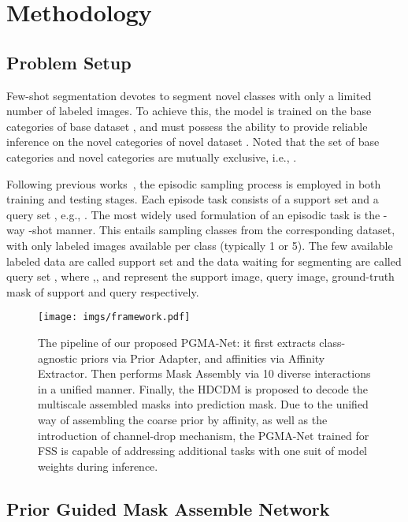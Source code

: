 \documentclass[lettersize,journal]{IEEEtran}
\begin{document}
\section{Methodology}
\subsection{Problem Setup}

Few-shot segmentation devotes to segment novel classes with only a limited number of labeled images. To achieve this, the model is trained on the base categories  of base dataset , and must possess the ability to provide reliable inference on the novel categories  of novel dataset . Noted that the set of base categories  and novel categories  are mutually exclusive, i.e., . 

Following previous works~\cite{tian2020prior,min2021hypercorrelation,shi2022dense}, the episodic sampling process is employed in both training and testing stages. Each episode task  consists of a support set  and a query set , e.g., . The most widely used formulation of an episodic task  is the -way -shot manner. This entails sampling  classes from the corresponding dataset, with only  labeled images available per class (typically 1 or 5). The few available labeled data are called support set  and the data waiting for segmenting are called query set , where ,, and  represent the support image, query image, ground-truth mask of support and query respectively.


\begin{figure*}[t!]
  \centering
  \texttt{[image: imgs/framework.pdf]}
  \caption{The pipeline of our proposed PGMA-Net: it first extracts class-agnostic priors via Prior Adapter, and affinities via Affinity Extractor. Then performs Mask Assembly via 10 diverse interactions in a unified manner. Finally, the HDCDM is proposed to decode the multiscale assembled masks into prediction mask. Due to the unified way of assembling the coarse prior by affinity, as well as the introduction of channel-drop mechanism, the PGMA-Net trained for FSS is capable of addressing additional tasks with one suit of model weights during inference.}
  \label{fig:framework}
\end{figure*}

\subsection{Prior Guided Mask Assemble Network}
\end{document}
